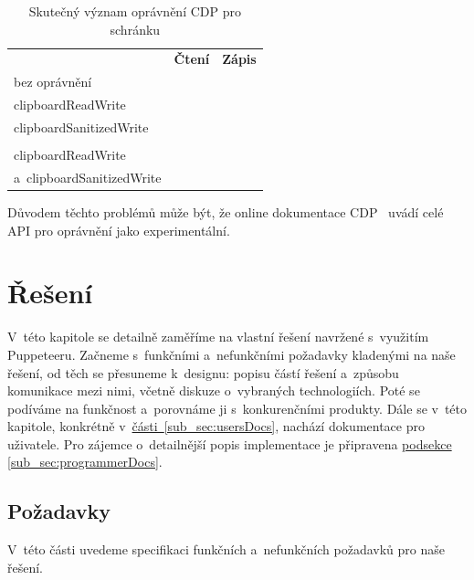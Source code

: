 \documentclass[12pt, a4paper, twoside]{article}
\newcommand{\cmark}{\ding{51}}
\newcommand{\xmark}{\ding{55}}
\newcommand{\refAddedText}[3]{\hyperref[#1]{#2\ref{#1}#3}}
\begin{document}
	\begin{table}[H]
		\centering
	\begin{tabular}{ lcc }
		\rowcolor{tableHeadingBackground}
		\multicolumn{1}{l}{\textbf{Udělená oprávnění}} & \multicolumn{1}{l}{\textbf{Čtení}} & \multicolumn{1}{l}{\textbf{Zápis}} \\
		bez oprávnění & \xmark & \cmark \\
		clipboardReadWrite & \cmark & \xmark \\
		clipboardSanitizedWrite & \xmark & \cmark \\
		& & \\
		clipboardReadWrite & \multirow{2}{*}{\cmark} &  \multirow{2}{*}{\cmark} \\
		a~clipboardSanitizedWrite & &  \\
		\end{tabular}
	\caption{Skutečný význam oprávnění CDP pro schránku}
	\end{table}
	Důvodem těchto problémů může být, že online dokumentace CDP~\cite{devtoolsProtocol} uvádí celé API pro oprávnění jako experimentální.
	\section{Řešení}
	\label{section:ourSolution}
	V~této kapitole se detailně zaměříme na vlastní řešení navržené s~využitím Puppeteeru. Začneme s~funkčními a~nefunkčními požadavky kladenými na naše řešení, od těch se přesuneme k~designu: popisu částí řešení a~způsobu komunikace mezi nimi, včetně diskuze o~vybraných technologiích. Poté se podíváme na funkčnost a~porovnáme ji s~konkurenčními produkty. Dále se v~této kapitole, konkrétně v~\refAddedText{sub_sec:usersDocs}{části~}{}, nachází dokumentace pro uživatele. Pro zájemce o~detailnější popis implementace je připravena \refAddedText{sub_sec:programmerDocs}{podsekce }{}.
	\subsection{Požadavky}
	\label{sub_sec:requirements}
	V~této části uvedeme specifikaci funkčních a~nefunkčních požadavků pro naše řešení. 
\end{document}
